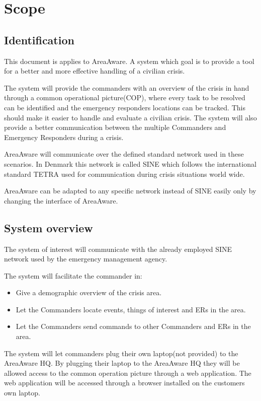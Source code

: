 
\chapter{Scope}
\label{chp:scope}

\section{Identification}
This document is applies to AreaAware.
A system which goal is to provide a tool for a better and more effective handling of a civilian crisis.

The system will provide the commanders with an overview of the crisis in hand through a common operational picture(COP), where every task to be resolved can be identified and the emergency responders locations can be tracked.
This should make it easier to handle and evaluate a civilian crisis. 
The system will also provide a better communication between the multiple Commanders and Emergency Responders during a crisis.

AreaAware will communicate over the defined standard network used in these scenarios.
In Denmark this network is called SINE which follows the international standard TETRA used for communication during crisis situations world wide.

AreaAware can be adapted to any specific network instead of SINE easily only by changing the interface of AreaAware.


\section{System overview}
The system of interest will communicate with the already employed SINE network used by the emergency management agency.

The system will facilitate the commander in:
\begin{itemize}
    \item Give a demographic overview of the crisis area.
    \item Let the Commanders locate events, things of interest and ERs in the area.
    \item Let the Commanders send commands to other Commanders and ERs in the area.
\end{itemize}

The system will let commanders plug their own laptop(not provided) to the AreaAware HQ.
By plugging their laptop to the AreaAware HQ they will be allowed access to the common operation picture through a web application. 
The web application will be accessed through a browser installed on the customers own laptop.


